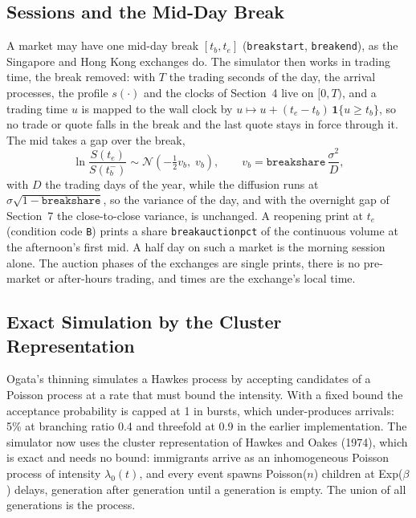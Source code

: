 \documentclass[11pt,a4paper]{article}
\newcommand{\key}[1]{\texttt{#1}}
\theoremstyle{paper}
\begin{document}
\subsection{Sessions and the Mid-Day Break}

A market may have one mid-day break $[t_b,t_e]$ (\key{breakstart}, \key{breakend}), as the Singapore and Hong Kong exchanges do. The simulator then works in trading time, the break removed: with $T$ the trading seconds of the day, the arrival processes, the profile $s(\cdot)$ and the clocks of Section~4 live on $[0,T)$, and a trading time $u$ is mapped to the wall clock by $u\mapsto u+(t_e-t_b)\,\mathbf{1}\{u\ge t_b\}$, so no trade or quote falls in the break and the last quote stays in force through it. The mid takes a gap over the break,
\begin{equation}
\ln\frac{S(t_e)}{S(t_b^-)}\sim\mathcal N\!\left(-\tfrac12 v_b,\;v_b\right),\qquad v_b=\key{breakshare}\,\frac{\sigma^2}{D},
\end{equation}
with $D$ the trading days of the year, while the diffusion runs at $\sigma\sqrt{1-\key{breakshare}}$, so the variance of the day, and with the overnight gap of Section~7 the close-to-close variance, is unchanged. A reopening print at $t_e$ (condition code \key{B}) prints a share \key{breakauctionpct} of the continuous volume at the afternoon's first mid. A half day on such a market is the morning session alone. The auction phases of the exchanges are single prints, there is no pre-market or after-hours trading, and times are the exchange's local time.

\subsection{Exact Simulation by the Cluster Representation}

Ogata's thinning simulates a Hawkes process by accepting candidates of a Poisson process at a rate that must bound the intensity. With a fixed bound the acceptance probability is capped at 1 in bursts, which under-produces arrivals: 5\% at branching ratio 0.4 and threefold at 0.9 in the earlier implementation. The simulator now uses the cluster representation of Hawkes and Oakes (1974), which is exact and needs no bound: immigrants arrive as an inhomogeneous Poisson process of intensity $\lambda_0(t)$, and every event spawns Poisson($n$) children at Exp($\beta$) delays, generation after generation until a generation is empty. The union of all generations is the process.
\end{document}
